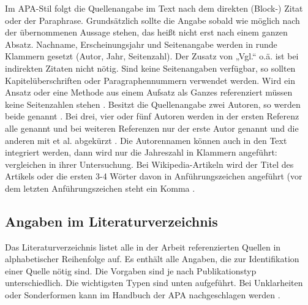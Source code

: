 Im APA-Stil folgt die Quellenangabe im Text nach dem direkten (Block-) Zitat oder der Paraphrase.
Grundsätzlich sollte die Angabe sobald wie möglich nach der übernommenen Aussage stehen, das heißt nicht erst nach einem ganzen Absatz.
Nachname, Erscheinungsjahr und Seitenangabe werden in runde Klammern gesetzt (Autor, Jahr, Seitenzahl).
Der Zusatz von „Vgl.“ o.ä. ist bei indirekten Zitaten nicht nötig.
Sind keine Seitenangaben verfügbar, so sollten Kapitelüberschriften oder Paragraphennummern verwendet werden.
Wird ein Ansatz oder eine Methode aus einem Aufsatz als Ganzes referenziert müssen keine Seitenzahlen stehen \cite{mustermann2013test}.
Besitzt die Quellenangabe zwei Autoren, so werden beide genannt \cite{mustermann2015gemeinsam}.
Bei drei, vier oder fünf Autoren werden in der ersten Referenz alle genannt \cite*{mustermann2017viele} und bei weiteren Referenzen nur der erste Autor genannt und die anderen mit et al. abgekürzt \cite{mustermann2017viele}.
Die Autorennamen können auch in den Text integriert werden, dann wird nur die Jahreszahl in Klammern angeführt: \citet{mustermann2013test} vergleichen in ihrer Untersuchung.
Bei Wikipedia-Artikeln wird der Titel des Artikels oder die ersten 3-4 Wörter davon in Anführungszeichen angeführt (vor dem letzten Anführungszeichen steht ein Komma \cite{noauthor_wissenschaft_2020}.

\subsection{Angaben im Literaturverzeichnis}\label{subsubsec:angaben}

Das Literaturverzeichnis listet alle in der Arbeit referenzierten Quellen in alphabetischer Reihenfolge auf.
Es enthält alle Angaben, die zur Identifikation einer Quelle nötig sind.
Die Vorgaben sind je nach Publikationstyp unterschiedlich.
Die wichtigsten Typen sind unten aufgeführt.
Bei Unklarheiten oder Sonderformen kann im Handbuch der APA nachgeschlagen werden \cite{american2010concise}.


\makeatletter 
\renewcommand\BR@b@bibitem[2][]{\BR@bibitem[#1]{#2}\BR@c@bibitem{#2}}           
\makeatother

\nobibliography*%



